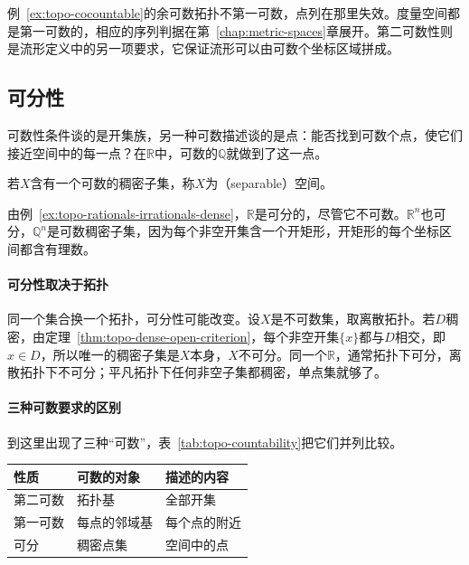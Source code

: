 例~\ref{ex:topo-cocountable}的余可数拓扑不第一可数，点列在那里失效。度量空间都是第一可数的，相应的序列判据在第~\ref{chap:metric-spaces}章展开。第二可数性则是流形定义中的另一项要求，它保证流形可以由可数个坐标区域拼成。

\subsection{可分性}
\label{sec:topo-separability}

可数性条件谈的是开集族，另一种可数描述谈的是点：能否找到可数个点，使它们接近空间中的每一点？在$\mathbb R$中，可数的$\mathbb Q$就做到了这一点。

\begin{definition}[可分空间]
\label{def:topo-separable}
若$X$含有一个可数的稠密子集，称$X$为（separable）空间。
\end{definition}

由例~\ref{ex:topo-rationals-irrationals-dense}，$\mathbb R$是可分的，尽管它不可数。$\mathbb R^n$也可分，$\mathbb Q^n$是可数稠密子集，因为每个非空开集含一个开矩形，开矩形的每个坐标区间都含有理数。

\paragraph{可分性取决于拓扑}
同一个集合换一个拓扑，可分性可能改变。设$X$是不可数集，取离散拓扑。若$D$稠密，由定理~\ref{thm:topo-dense-open-criterion}，每个非空开集$\{x\}$都与$D$相交，即$x\in D$，所以唯一的稠密子集是$X$本身，$X$不可分。同一个$\mathbb R$，通常拓扑下可分，离散拓扑下不可分；平凡拓扑下任何非空子集都稠密，单点集就够了。

\paragraph{三种可数要求的区别}
到这里出现了三种“可数”，表~\ref{tab:topo-countability}把它们并列比较。

\begin{BookInlineTable}
  \centering
  \begin{tabular}{@{}lll@{}}
    \toprule
    性质 & 可数的对象 & 描述的内容\\
    \midrule
    第二可数 & 拓扑基 & 全部开集\\
    第一可数 & 每点的邻域基 & 每个点的附近\\
    可分 & 稠密点集 & 空间中的点\\
    \bottomrule
  \end{tabular}
  \caption{三种可数性要求。第二可数能推出另外两者，反向一般不成立。}
  \label{tab:topo-countability}
\end{BookInlineTable}

